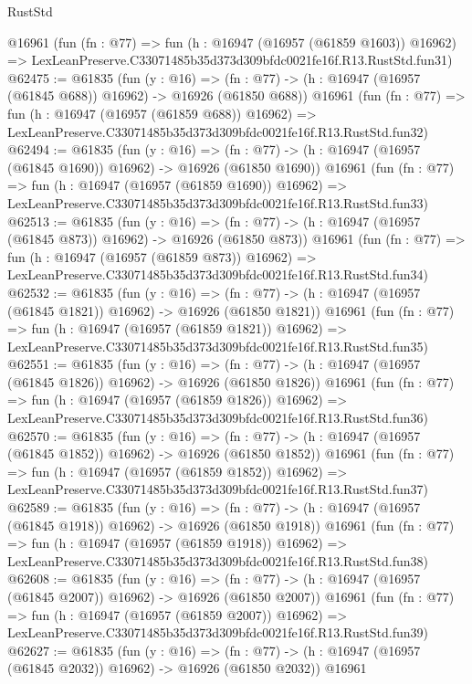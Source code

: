 \begin{lexlean}{RustStd}
\begin{coremodule}
    @16961
    (fun (fn : @77) =>
    fun (h : @16947 (@16957 (@61859 @1603)) @16962) =>
    LexLeanPreserve.C33071485b35d373d309bfdc0021fe16f.R13.RustStd.fun31)
@62475 := @61835
    (fun (y : @16) =>
    (fn : @77) -> (h : @16947 (@16957 (@61845 @688)) @16962) -> @16926 (@61850 @688))
    @16961
    (fun (fn : @77) =>
    fun (h : @16947 (@16957 (@61859 @688)) @16962) =>
    LexLeanPreserve.C33071485b35d373d309bfdc0021fe16f.R13.RustStd.fun32)
@62494 := @61835
    (fun (y : @16) =>
    (fn : @77) -> (h : @16947 (@16957 (@61845 @1690)) @16962) -> @16926 (@61850 @1690))
    @16961
    (fun (fn : @77) =>
    fun (h : @16947 (@16957 (@61859 @1690)) @16962) =>
    LexLeanPreserve.C33071485b35d373d309bfdc0021fe16f.R13.RustStd.fun33)
@62513 := @61835
    (fun (y : @16) =>
    (fn : @77) -> (h : @16947 (@16957 (@61845 @873)) @16962) -> @16926 (@61850 @873))
    @16961
    (fun (fn : @77) =>
    fun (h : @16947 (@16957 (@61859 @873)) @16962) =>
    LexLeanPreserve.C33071485b35d373d309bfdc0021fe16f.R13.RustStd.fun34)
@62532 := @61835
    (fun (y : @16) =>
    (fn : @77) -> (h : @16947 (@16957 (@61845 @1821)) @16962) -> @16926 (@61850 @1821))
    @16961
    (fun (fn : @77) =>
    fun (h : @16947 (@16957 (@61859 @1821)) @16962) =>
    LexLeanPreserve.C33071485b35d373d309bfdc0021fe16f.R13.RustStd.fun35)
@62551 := @61835
    (fun (y : @16) =>
    (fn : @77) -> (h : @16947 (@16957 (@61845 @1826)) @16962) -> @16926 (@61850 @1826))
    @16961
    (fun (fn : @77) =>
    fun (h : @16947 (@16957 (@61859 @1826)) @16962) =>
    LexLeanPreserve.C33071485b35d373d309bfdc0021fe16f.R13.RustStd.fun36)
@62570 := @61835
    (fun (y : @16) =>
    (fn : @77) -> (h : @16947 (@16957 (@61845 @1852)) @16962) -> @16926 (@61850 @1852))
    @16961
    (fun (fn : @77) =>
    fun (h : @16947 (@16957 (@61859 @1852)) @16962) =>
    LexLeanPreserve.C33071485b35d373d309bfdc0021fe16f.R13.RustStd.fun37)
@62589 := @61835
    (fun (y : @16) =>
    (fn : @77) -> (h : @16947 (@16957 (@61845 @1918)) @16962) -> @16926 (@61850 @1918))
    @16961
    (fun (fn : @77) =>
    fun (h : @16947 (@16957 (@61859 @1918)) @16962) =>
    LexLeanPreserve.C33071485b35d373d309bfdc0021fe16f.R13.RustStd.fun38)
@62608 := @61835
    (fun (y : @16) =>
    (fn : @77) -> (h : @16947 (@16957 (@61845 @2007)) @16962) -> @16926 (@61850 @2007))
    @16961
    (fun (fn : @77) =>
    fun (h : @16947 (@16957 (@61859 @2007)) @16962) =>
    LexLeanPreserve.C33071485b35d373d309bfdc0021fe16f.R13.RustStd.fun39)
@62627 := @61835
    (fun (y : @16) =>
    (fn : @77) -> (h : @16947 (@16957 (@61845 @2032)) @16962) -> @16926 (@61850 @2032))
    @16961

\end{coremodule}
\end{lexlean}
